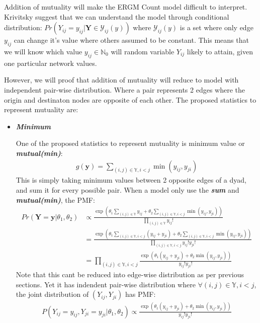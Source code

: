 \documentclass[12pt,a4paper,twoside,openany]{book}
\begin{document}
Addition of mutuality will make the ERGM Count model difficult to interpret. Krivitsky suggest that we can understand the model through conditional distribution:
$Pr(Y_{ij}=y_{ij}| \bm{Y} \in \mathcal{Y}_{ij}(y))$ where 
$\mathcal{Y}_{ij}(y)$ is a set where only edge $y_{ij}$ can change it's value where others assumed to be constant.
This means that we will know which value $y_{ij} \in \mathbb{N}_0$ will random variable $Y_{ij}$ likely to attain, given one particular network values. 

However, we will proof that addition of mutuality will reduce to model with independent pair-wise distribution. 
Where a pair represents 2 edges where the origin and destinaton nodes are opposite of each other.
The proposed statistics to represent mutuality are:
\begin{itemize}

\item \textit{\textbf{Minimum}}

One of the proposed statistics to represent mutuality is minimum value or \textit{\textbf{mutual(min)}}: 
\begin{align}
g(\bm{y}) = \sum_{(i,j)\in\mathbb{Y},i<j} \min(y_{ij},y_{ji})
\end{align}
This is simply taking minimum values between 2 opposite edges of a dyad, and sum it for every possible pair.
When a model only use the \textit{\textbf{sum}} and \textit{\textbf{mutual(min)}}, the PMF:
\begin{align*}
Pr(\bm{Y}=\bm{y}|\theta_1,\theta_2) &\propto \frac{\exp\left(\theta_1 \sum_{(i,j) \in \mathbb{Y}} y_{ij} + \theta_{2}\sum_{(i,j)\in\mathbb{Y},i<j} \min(y_{ij},y_{ji})\right)}{\prod_{(i,j) \in \mathbb{Y}}y_{ij}!}\\
&= \frac{\exp\left(\theta_1 \sum_{(i,j) \in \mathbb{Y},i<j} (y_{ij}+y_{ji}) + \theta_{2}\sum_{(i,j)\in\mathbb{Y},i<j} \min(y_{ij},y_{ji})\right)}{\prod_{(i,j) \in \mathbb{Y},i<j}y_{ij}!y_{ji}!}\\
&= \prod_{(i,j) \in \mathbb{Y},i<j} \frac{\exp(\theta_1(y_{ij}+y_{ji})+\theta_2 \min(y_{ij},y_{ji}))}{y_{ij}!y_{ji}!}
\end{align*}
Note that this cant be reduced into edge-wise distribution as per previous sections. Yet it has indendent pair-wise distribution where $\forall(i,j) \in\mathbb{Y},i<j$, the joint distribution of $(Y_{ij},Y_{ji})$ has PMF:
\begin{align*}
P(Y_{ij}=y_{ij},Y_{ji}=y_{ji}|\theta_1,\theta_2) \propto \frac{\exp(\theta_1(y_{ij}+y_{ji})+\theta_2 \min(y_{ij},y_{ji}))}{y_{ij}!y_{ji}!}
\end{align*}


\end{itemize}
\end{document}
